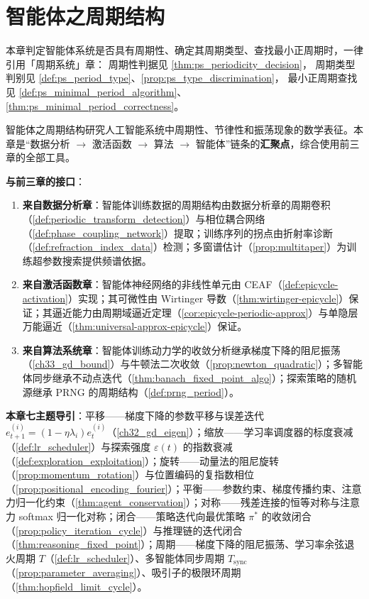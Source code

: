 \chapter{智能体之周期结构}
\label{chap:agent-periodic}

\begin{remark}[本章目标的周期性判定（引用）]\label{rem:agent_ps_hook}
本章判定智能体系统是否具有周期性、确定其周期类型、查找最小正周期时，一律引用「周期系统」章：
周期性判据见 \cref{thm:ps_periodicity_decision}，
周期类型判别见 \cref{def:ps_period_type}、\cref{prop:ps_type_discrimination}，
最小正周期查找见 \cref{def:ps_minimal_period_algorithm}、\cref{thm:ps_minimal_period_correctness}。
\end{remark}

\begin{remark}\label{rem:agent-chapter-positioning}
智能体之周期结构研究人工智能系统中周期性、节律性和振荡现象的数学表征。本章是“数据分析 $\to$ 激活函数 $\to$ 算法 $\to$ 智能体”链条的\textbf{汇聚点}，综合使用前三章的全部工具。

\textbf{与前三章的接口}：
\begin{enumerate}[label=(\arabic*)]
    \item \textbf{来自数据分析章}：智能体训练数据的周期结构由数据分析章的周期卷积（\cref{def:periodic_transform_detection}）与相位耦合网络（\cref{def:phase_coupling_network}）提取；训练序列的拐点由折射率诊断（\cref{def:refraction_index_data}）检测；多窗谱估计（\cref{prop:multitaper}）为训练超参数搜索提供频谱依据。
    \item \textbf{来自激活函数章}：智能体神经网络的非线性单元由 CEAF（\cref{def:epicycle-activation}）实现；其可微性由 Wirtinger 导数（\cref{thm:wirtinger-epicycle}）保证；其逼近能力由周期域逼近定理（\cref{cor:epicycle-periodic-approx}）与单隐层万能逼近（\cref{thm:universal-approx-epicycle}）保证。
    \item \textbf{来自算法系统章}：智能体训练动力学的收敛分析继承梯度下降的阻尼振荡（\cref{ch33_gd_bound}）与牛顿法二次收敛（\cref{prop:newton_quadratic}）；多智能体同步继承不动点迭代（\cref{thm:banach_fixed_point_algo}）；探索策略的随机源继承 PRNG 的周期结构（\cref{def:prng_period}）。
\end{enumerate}

\textbf{本章七主题导引}：平移——梯度下降的参数平移与误差迭代 $e_{t+1}^{(i)} = (1-\eta\lambda_i)e_t^{(i)}$（\cref{ch32_gd_eigen}）；缩放——学习率调度器的标度衰减（\cref{def:lr_scheduler}）与探索强度 $\varepsilon(t)$ 的指数衰减（\cref{def:exploration_exploitation}）；旋转——动量法的阻尼旋转（\cref{prop:momentum_rotation}）与位置编码的复指数相位（\cref{prop:positional_encoding_fourier}）；平衡——参数约束、梯度传播约束、注意力归一化约束（\cref{thm:agent_conservation}）；对称——残差连接的恒等对称与注意力 softmax 归一化对称；闭合——策略迭代向最优策略 $\pi^*$ 的收敛闭合（\cref{prop:policy_iteration_cycle}）与推理链的迭代闭合（\cref{thm:reasoning_fixed_point}）；周期——梯度下降的阻尼振荡、学习率余弦退火周期 $T$（\cref{def:lr_scheduler}）、多智能体同步周期 $T_{\text{sync}}$（\cref{prop:parameter_averaging}）、吸引子的极限环周期（\cref{thm:hopfield_limit_cycle}）。


\end{remark}
